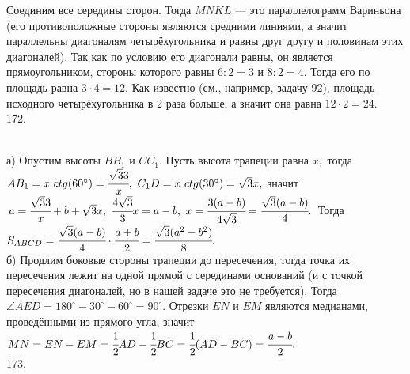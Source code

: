 \documentclass[12pt]{article}
\begin{document}
Соединим все середины сторон. Тогда $MNKL$ --- это параллелограмм Вариньона (его противоположные стороны являются средними линиями, а значит параллельны диагоналям четырёхугольника и равны друг другу и половинам этих диагоналей). Так как по условию его диагонали равны, он является прямоугольником, стороны которого равны $6:2=3$ и $8:2=4.$ Тогда его по площадь равна $3\cdot4=12.$ Как известно (см., например, задачу 92), площадь исходного четырёхугольника в 2 раза больше, а значит она равна $12\cdot2=24.$\\
172. \begin{figure}[ht!]
\end{figure}\\
а) Опустим высоты $BB_1$ и $CC_1.$ Пусть высота трапеции равна $x,$ тогда $AB_1=x\ ctg(60^\circ)=\cfrac{\sqrt{3}{3}}x,\ C_1D=x\ ctg(30^\circ)=\sqrt{3}x,$ значит $a=
\cfrac{\sqrt{3}{3}}x+b+\sqrt{3}x,\ \cfrac{4\sqrt{3}}{3}x=a-b,\ x=\cfrac{3(a-b)}{4\sqrt{3}}=\cfrac{\sqrt{3}(a-b)}{4}.$ Тогда
$S_{ABCD}=\cfrac{\sqrt{3}(a-b)}{4}\cdot\cfrac{a+b}{2}=\cfrac{\sqrt{3}(a^2-b^2)}{8}.$\\
б) Продлим боковые стороны трапеции до пересечения, тогда точка их пересечения лежит на одной прямой с серединами оснований (и с точкой пересечения диагоналей, но в нашей задаче это не требуется). Тогда $\angle AED=180^\circ-30^\circ-60^\circ=90^\circ.$ Отрезки $EN$ и $EM$ являются медианами, проведёнными из прямого угла, значит $MN=EN-EM=\cfrac{1}{2}AD-\cfrac{1}{2}BC=\cfrac{1}{2}(AD-BC)=\cfrac{a-b}{2}.$\\
173. \begin{figure}[ht!]
\end{figure}\\
\end{document}
